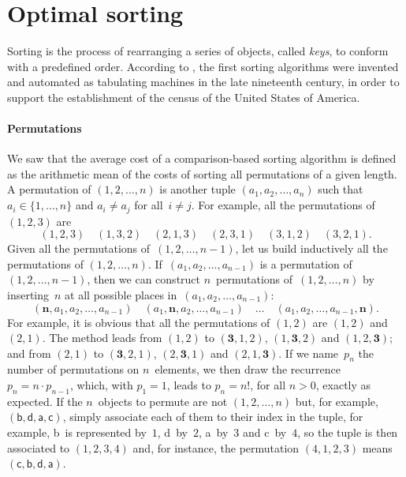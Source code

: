 \section{Optimal sorting}
\label{sec:opt_sort}

Sorting is the process of rearranging a series of objects, called
\emph{keys}, to conform with a predefined
order. According to \cite{Knuth_1998}, the first sorting algorithms
were invented and automated as tabulating machines in the late
nineteenth century, in order to support the establishment of the
census of the United States of America.

\paragraph{Permutations}
\label{par:permutations}

We saw  that the average cost of a
comparison\hyp{}based sorting algorithm is defined as the arithmetic
mean of the costs of sorting all permutations of a given length. A
permutation of \((1,2,\dots,n)\) is another tuple
\((a_1,a_2,\dots,a_n)\) such that \(a_i \in \{1,\dots,n\}\) and \(a_i
\neq a_j\) for all~\(i \neq j\). For example, all the permutations
of~\((1,2,3)\) are
\begin{equation*}
(1,2,3) \quad (1,3,2) \quad (2,1,3) \quad (2,3,1) \quad (3,1,2) \quad
(3,2,1).
\end{equation*}
Given all the permutations of~\((1,2,\dots,n-1)\), let us build
inductively all the permutations of
\((1,2,\dots,n)\). If~\((a_1,a_2,\dots,a_{n-1})\) is a permutation of
\((1,2,\dots,n-1)\), then we can construct \(n\)~permutations
of~\((1,2,\dots,n)\) by inserting~\(n\) at all possible places
in~\((a_1,a_2,\dots,a_{n-1})\):
\begin{equation*}
(\boldsymbol{n},a_1,a_2,\dots,a_{n-1})\quad
(a_1,\boldsymbol{n},a_2,\dots,a_{n-1})\quad \ldots \quad
(a_1,a_2,\dots,a_{n-1},\boldsymbol{n}).
\end{equation*}
For example, it is obvious that all the permutations of \((1,2)\) are
\((1,2)\) and \((2,1)\). The method leads from \((1,2)\) to
\((\boldsymbol{3},1,2)\), \((1,\boldsymbol{3},2)\) and
\((1,2,\boldsymbol{3})\); and from \((2,1)\) to
\((\boldsymbol{3},2,1)\), \((2,\boldsymbol{3},1)\) and
\((2,1,\boldsymbol{3})\). If we name~\(p_n\) the number of
permutations on \(n\)~elements, we then draw the recurrence \(p_n = n
\cdot p_{n-1}\), which, with \(p_1 = 1\), leads to \({p_n = n!}\), for
all \({n > 0}\), exactly as expected. If the \(n\)~objects to permute
are not \((1,2,\dots,n)\) but, for example,
\((\textsf{b},\textsf{d},\textsf{a},\textsf{c})\), simply associate
each of them to their index in the tuple, for example, \textsf{b}~is
represented by~\(1\), \textsf{d}~by~\(2\), \textsf{a}~by~\(3\) and
\textsf{c}~by~\(4\), so the tuple is then associated to \((1,2,3,4)\)
and, for instance, the permutation \((4,1,2,3)\)
means~\((\textsf{c},\textsf{b},\textsf{d},\textsf{a})\).

